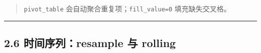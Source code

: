 \begin{Shaded}
\begin{Highlighting}[]
\OperatorTok{=}\NormalTok{: [}\NormalTok{, }\NormalTok{, }\NormalTok{, }\NormalTok{, }\NormalTok{],}
                   \NormalTok{: [}\NormalTok{, }\NormalTok{, }\NormalTok{, }\NormalTok{, }\NormalTok{],}
                   \NormalTok{: [}\NormalTok{, }\NormalTok{, }\NormalTok{, }\NormalTok{, }\NormalTok{]\})}
\OperatorTok{=}\OperatorTok{=}\OperatorTok{=}\OperatorTok{=}\NormalTok{,}
\OperatorTok{=}\OperatorTok{=}\NormalTok{)}
\end{Highlighting}
\end{Shaded}

\begin{Shaded}
\begin{Highlighting}[]
\end{Highlighting}
\end{Shaded}

\begin{quote}
\texttt{pivot\_table} 会自动聚合重复项；\texttt{fill\_value=0}
填充缺失交叉格。
\end{quote}

\begin{center}\rule{0.5\linewidth}{0.5pt}\end{center}

\subsection{2.6 时间序列：resample 与
rolling}\label{ux65f6ux95f4ux5e8fux5217resample-ux4e0e-rolling}

